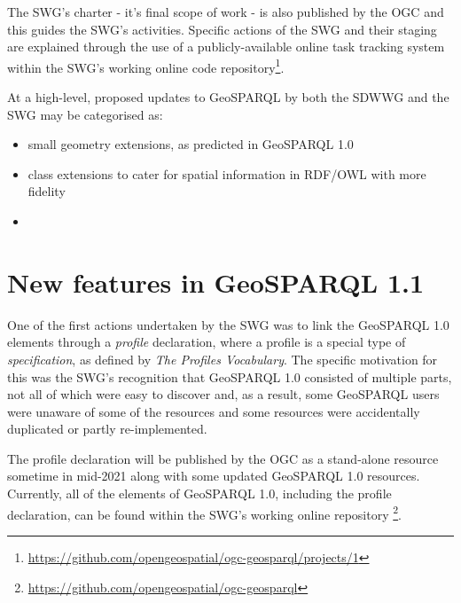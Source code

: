 \documentclass[runningheads]{llncs}
\begin{document}
The SWG's charter - it's final scope of work - is also published by the OGC \cite{abhayaratna2020ogc} and this guides 
the SWG's activities. Specific actions of the SWG and their staging are explained through the use of a publicly-available 
online task tracking system within the SWG's working online code repository\footnote{\url{https://github.com/opengeospatial/ogc-geosparql/projects/1}}.

At a high-level, proposed updates to GeoSPARQL by both the SDWWG and the SWG may be categorised as:


\begin{itemize}
    \item small geometry extensions, as predicted in GeoSPARQL 1.0
    \item class extensions to cater for spatial information in RDF/OWL with more fidelity
    \item 
\end{itemize}








\section{New features in GeoSPARQL 1.1}\label{sec:newfeatures}
One of the first actions undertaken by the SWG was to link the GeoSPARQL 1.0 elements through a \textit{profile} 
declaration, where a profile is a special type of \textit{specification}, as defined by \textit{The Profiles Vocabulary}\cite{atkinson_profiles_2020}. 
The specific motivation for this was the SWG's recognition that GeoSPARQL 1.0 consisted of multiple parts, not all
of which were easy to discover and, as a result, some GeoSPARQL users were unaware of some of the resources and some
resources were accidentally duplicated or partly re-implemented.

The profile declaration will be published by the OGC as a stand-alone resource sometime in mid-2021 along with some 
updated GeoSPARQL 1.0 resources. Currently, all of the elements of GeoSPARQL 1.0, including the profile declaration, 
can be found within the SWG's working online repository \footnote{\url{https://github.com/opengeospatial/ogc-geosparql}}.

\end{document}

